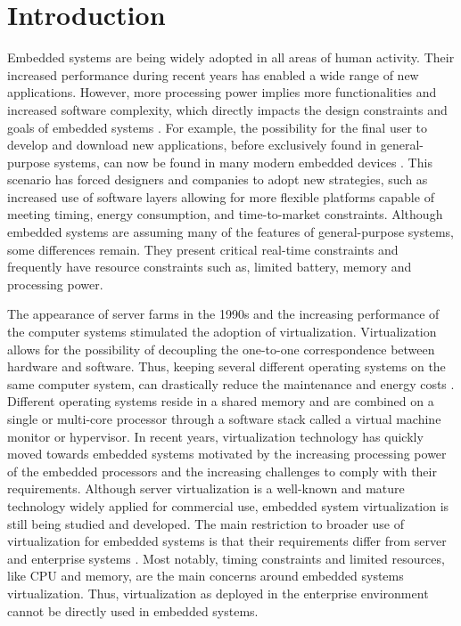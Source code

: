 \chapter{\label{chapter:intro}Introduction}

Embedded systems are being widely adopted in all areas of human activity. Their increased performance during recent years has enabled a wide range of new applications. However, more processing power implies more functionalities and increased software complexity, which directly impacts the design constraints and goals of embedded systems \cite{sisu2014}. For example, the possibility for the final user to develop and download new applications, before exclusively found in general-purpose systems, can now be found in many modern embedded devices \cite{HeiserRole}. This scenario has forced designers and companies to adopt new strategies, such as increased use of software layers allowing for more flexible platforms capable of meeting timing, energy consumption, and time-to-market constraints. Although embedded systems are assuming many of the features of general-purpose systems, some differences remain. They present critical real-time constraints and frequently have resource constraints such as, limited battery, memory and processing power. 

The appearance of server farms in the 1990s and the increasing performance of the computer systems stimulated the adoption of virtualization. Virtualization allows for the possibility of decoupling the one-to-one correspondence between hardware and software. Thus, keeping several different operating systems on the same computer system, can drastically reduce the maintenance and energy costs \cite{muench2014}.  Different operating systems reside in a shared memory and are combined on a single or multi-core processor through a software stack called a virtual machine monitor or hypervisor. In recent years,  virtualization technology has quickly moved towards embedded systems motivated by the increasing processing power of the embedded processors and the increasing challenges to comply with their requirements. Although server virtualization is a well-known and mature technology widely applied for commercial use, embedded system virtualization is still being studied and developed. The main restriction to broader use of virtualization for embedded systems is that their requirements differ from server and enterprise systems \cite{Sandtrom2013}. Most notably, timing constraints and limited resources, like CPU and memory, are the main concerns around embedded systems virtualization. Thus, virtualization as deployed in the enterprise environment cannot be directly used in embedded systems. 

